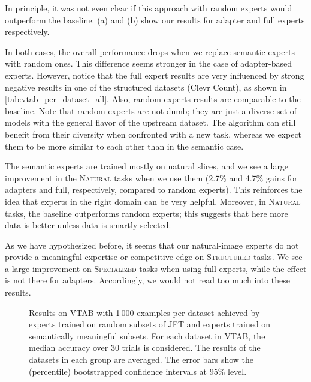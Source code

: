 \documentclass{article}
\newcommand{\JFT}{{JFT}\xspace}
\begin{document}
In principle, it was not even clear if this approach with random experts would outperform the baseline.
 (a) and (b) show our results for adapter and full experts respectively.

In both cases, the overall performance drops when we replace semantic experts with random ones.
This difference seems stronger in the case of adapter-based experts.
However, notice that the full expert results are very influenced by 
strong negative results in one of the structured datasets 
(Clevr Count), as shown in \cref{tab:vtab_per_dataset_all}.
Also, random experts results are comparable to the baseline.
Note that random experts are not dumb; they are just a diverse set of models with the general flavor of the upstream dataset.
The algorithm can still benefit from their diversity when confronted 
with a new task, whereas we expect them to be more similar to each other than in the semantic case.

The semantic experts are trained mostly on natural slices, and we see a large improvement in the \textsc{Natural} tasks when we use them (2.7\% and 4.7\% gains for adapters and full, respectively, compared to random experts).
This reinforces the idea that experts in the right domain can be very helpful.
Moreover, in \textsc{Natural} tasks, the baseline outperforms random experts; this suggests that here more data is better unless data is smartly selected.

As we have hypothesized before, it seems that our natural-image experts do not provide a meaningful expertise or competitive edge on \textsc{Structured} tasks.
We see a large improvement on \textsc{Specialized} tasks when using full experts, while the effect is not there for adapters.
Accordingly, we would not read too much into these results.



\begin{figure}[htb]
\centering
{}
\caption{Results on VTAB with 1\,000 examples per dataset achieved by experts 
trained on random subsets of \JFT and experts trained on semantically meaningful
subsets. For each dataset in VTAB, the median accuracy over 30 trials is 
considered.  The results of the datasets in each group are averaged. 
The error bars show the (percentile) bootstrapped confidence intervals at 
95\% level.}
\label{fig:vtab_test_expert_vs_many_models}
\end{figure}








 
\end{document}
